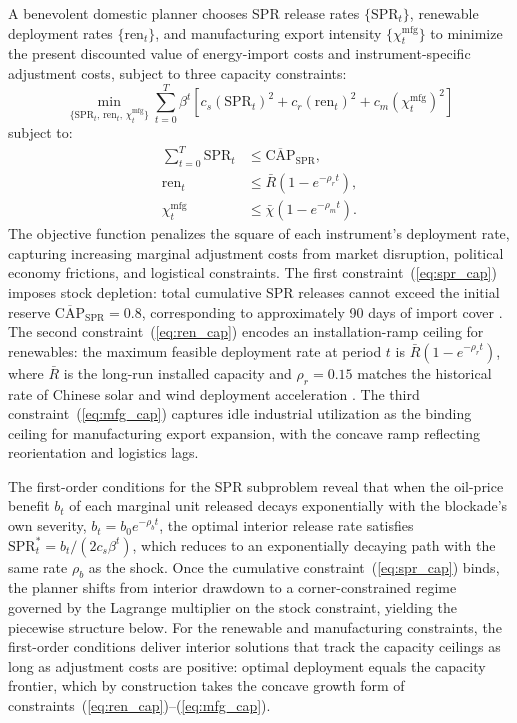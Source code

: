 \documentclass[12pt]{article}
\begin{document}
A benevolent domestic planner chooses SPR release rates $\{\text{SPR}_t\}$, renewable deployment rates $\{\text{ren}_t\}$, and manufacturing export intensity $\{\chi^{\text{mfg}}_t\}$ to minimize the present discounted value of energy-import costs and instrument-specific adjustment costs, subject to three capacity constraints:
\begin{equation}
\min_{\{\text{SPR}_t,\,\text{ren}_t,\,\chi^{\text{mfg}}_t\}} \sum_{t=0}^{T} \beta^t \left[ c_s (\text{SPR}_t)^2 + c_r (\text{ren}_t)^2 + c_m (\chi^{\text{mfg}}_t)^2 \right]
\label{eq:china_opt}
\end{equation}
subject to:
\begin{align}
\sum_{t=0}^{T} \text{SPR}_t &\leq \overline{\text{CAP}}_{\text{SPR}}, \label{eq:spr_cap} \\
\text{ren}_t &\leq \bar{R}\left(1-e^{-\rho_r t}\right), \label{eq:ren_cap} \\
\chi^{\text{mfg}}_t &\leq \bar{\chi}\left(1-e^{-\rho_m t}\right). \label{eq:mfg_cap}
\end{align}
The objective function penalizes the square of each instrument's deployment rate, capturing increasing marginal adjustment costs from market disruption, political economy frictions, and logistical constraints. The first constraint~(\ref{eq:spr_cap}) imposes stock depletion: total cumulative SPR releases cannot exceed the initial reserve $\overline{\text{CAP}}_{\text{SPR}} = 0.8$, corresponding to approximately 90 days of import cover \citep{eia2023hormuz}. The second constraint~(\ref{eq:ren_cap}) encodes an installation-ramp ceiling for renewables: the maximum feasible deployment rate at period $t$ is $\bar{R}(1-e^{-\rho_r t})$, where $\bar{R}$ is the long-run installed capacity and $\rho_r = 0.15$ matches the historical rate of Chinese solar and wind deployment acceleration \citep{helveston2019china}. The third constraint~(\ref{eq:mfg_cap}) captures idle industrial utilization as the binding ceiling for manufacturing export expansion, with the concave ramp reflecting reorientation and logistics lags.

The first-order conditions for the SPR subproblem reveal that when the oil-price benefit $b_t$ of each marginal unit released decays exponentially with the blockade's own severity, $b_t = b_0 e^{-\rho_b t}$, the optimal interior release rate satisfies $\text{SPR}_t^* = b_t / (2c_s \beta^t)$, which reduces to an exponentially decaying path with the same rate $\rho_b$ as the shock. Once the cumulative constraint~(\ref{eq:spr_cap}) binds, the planner shifts from interior drawdown to a corner-constrained regime governed by the Lagrange multiplier on the stock constraint, yielding the piecewise structure below. For the renewable and manufacturing constraints, the first-order conditions deliver interior solutions that track the capacity ceilings as long as adjustment costs are positive: optimal deployment equals the capacity frontier, which by construction takes the concave growth form of constraints~(\ref{eq:ren_cap})--(\ref{eq:mfg_cap}).
\end{document}
